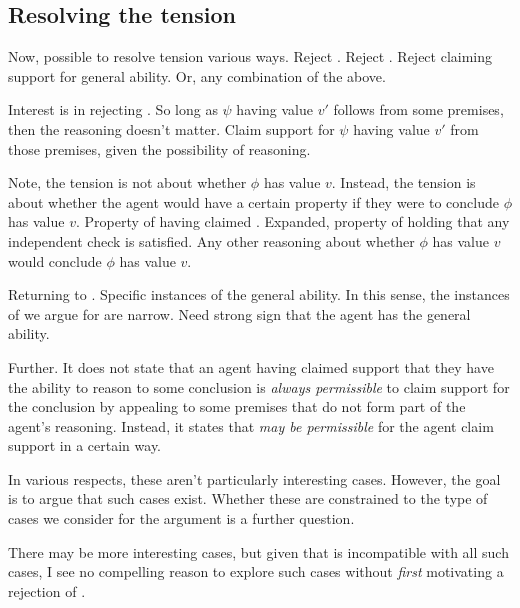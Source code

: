 \subsection{Resolving the tension}
\label{sec:overview:resolving-tension}

\begin{note}
  Now, possible to resolve tension various ways.
  Reject \ideaCS{}.
  Reject \ESU{}.
  Reject claiming support for general ability.
  Or, any combination of the above.

  Interest is in rejecting \ESU{}.
  So long as \(\psi\) having value \(v'\) follows from some premises, then the reasoning doesn't matter.
  Claim support for \(\psi\) having value \(v'\) from those premises, given the possibility of reasoning.
\end{note}

\begin{note}
  Note, the tension is not about whether \(\phi\) has value \(v\).
  Instead, the tension is about whether the agent would have a certain property if they were to conclude \(\phi\) has value \(v\).
  Property of having claimed \support{}.
  Expanded, property of holding that any independent check is satisfied.
  Any other reasoning about whether \(\phi\) has value \(v\) would conclude \(\phi\) has value \(v\).
\end{note}

\begin{note}
  Returning to \EAS{}.
  Specific instances of the general ability.
  In this sense, the instances of \EAS{} we argue for are narrow.
  Need strong sign that the agent has the general ability.

  Further.
  It does not state that an agent having claimed support that they have the ability to reason to some conclusion is \emph{always permissible} to claim support for the conclusion by appealing to some premises that do not form part of the agent's reasoning.
  Instead, it states that \emph{may be permissible} for the agent claim support in a certain way.

  In various respects, these aren't particularly interesting cases.
  However, the goal is to argue that such cases exist.
  Whether these are constrained to the type of cases we consider for the argument is a further question.

  There may be more interesting cases, but given that \ESU{} is incompatible with all such cases, I see no compelling reason to explore such cases without \emph{first} motivating a rejection of \ESU{}.
\end{note}

